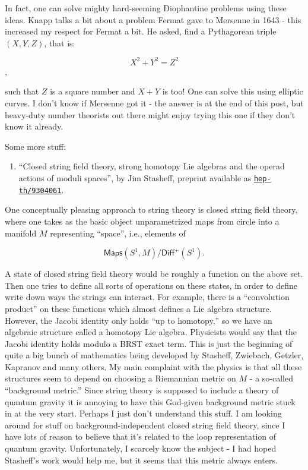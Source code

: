 \documentclass{article}
\def\tightlist{}
\begin{document}
In fact, one can solve mighty hard-seeming Diophantine problems using
these ideas. Knapp talks a bit about a problem Fermat gave to Mersenne
in 1643 - this increased my respect for Fermat a bit. He asked, find a
Pythagorean triple \((X,Y,Z)\), that is:

\[X^2 + Y^2 = Z^2\],

such that \(Z\) is a square number and \(X + Y\) is too! One can solve
this using elliptic curves. I don't know if Mersenne got it - the answer
is at the end of this post, but heavy-duty number theorists out there
might enjoy trying this one if they don't know it already.

Some more stuff:

\begin{enumerate}
\def\labelenumi{\arabic{enumi})}
\setcounter{enumi}{3}
\tightlist
\item
  ``Closed string field theory, strong homotopy Lie algebras and the
  operad actions of moduli spaces'', by Jim Stasheff, preprint available
  as
  \href{http://xxx.lanl.gov/abs/hep-th/9304061}{\texttt{hep-th/9304061}}.
\end{enumerate}

One conceptually pleasing approach to string theory is closed string
field theory, where one takes as the basic object unparametrized maps
from circle into a manifold \(M\) representing ``space'', i.e., elements
of

\[\mathsf{Maps}(S^1,M)/\mathsf{Diff}^+(S^1).\]

A state of closed string field theory would be roughly a function on the
above set. Then one tries to define all sorts of operations on these
states, in order to define write down ways the strings can interact. For
example, there is a ``convolution product'' on these functions which
almost defines a Lie algebra structure. However, the Jacobi identity
only holds ``up to homotopy,'' so we have an algebraic structure called
a homotopy Lie algebra. Physicists would say that the Jacobi identity
holds modulo a BRST exact term. This is just the beginning of quite a
big bunch of mathematics being developed by Stasheff, Zwiebach, Getzler,
Kapranov and many others. My main complaint with the physics is that all
these structures seem to depend on choosing a Riemannian metric on \(M\)
- a so-called ``background metric.'' Since string theory is supposed to
include a theory of quantum gravity it is annoying to have this
God-given background metric stuck in at the very start. Perhaps I just
don't understand this stuff. I am looking around for stuff on
background-independent closed string field theory, since I have lots of
reason to believe that it's related to the loop representation of
quantum gravity. Unfortunately, I scarcely know the subject - I had
hoped Stasheff's work would help me, but it seems that this metric
always enters.
\end{document}
